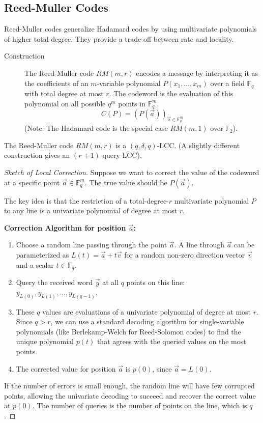 \subsection{Reed-Muller Codes}

Reed-Muller codes generalize Hadamard codes by using multivariate polynomials of higher total degree. They provide a trade-off between rate and locality.

\begin{description}
    \item[Construction] The Reed-Muller code $RM(m, r)$ encodes a message by interpreting it as the coefficients of an $m$-variable polynomial $P(x_1, \dots, x_m)$ over a field $\mathbb{F}_q$ with total degree at most $r$. The codeword is the evaluation of this polynomial on all possible $q^m$ points in $\mathbb{F}_q^m$.
    \[ C(P) = (P(\vec{a}))_{\vec{a} \in \mathbb{F}_q^m} \]
    (Note: The Hadamard code is the special case $RM(m, 1)$ over $\mathbb{F}_2$).
\end{description}

\begin{theorem}
The Reed-Muller code $RM(m, r)$ is a $(q, \delta, q)$-LCC. (A slightly different construction gives an $(r+1)$-query LCC).
\end{theorem}
\begin{proof}[Sketch of Local Correction]
Suppose we want to correct the value of the codeword at a specific point $\vec{a} \in \mathbb{F}_q^m$. The true value should be $P(\vec{a})$.

The key idea is that the restriction of a total-degree-$r$ multivariate polynomial $P$ to any line is a univariate polynomial of degree at most $r$.

\textbf{Correction Algorithm for position $\vec{a}$:}
\begin{enumerate}
    \item Choose a random line passing through the point $\vec{a}$. A line through $\vec{a}$ can be parameterized as $L(t) = \vec{a} + t\vec{v}$ for a random non-zero direction vector $\vec{v}$ and a scalar $t \in \mathbb{F}_q$.
    \item Query the received word $\vec{y}$ at all $q$ points on this line: $y_{L(0)}, y_{L(1)}, \dots, y_{L(q-1)}$.
    \item These $q$ values are evaluations of a univariate polynomial of degree at most $r$. Since $q > r$, we can use a standard decoding algorithm for single-variable polynomials (like Berlekamp-Welch for Reed-Solomon codes) to find the unique polynomial $p(t)$ that agrees with the queried values on the most points.
    \item The corrected value for position $\vec{a}$ is $p(0)$, since $\vec{a} = L(0)$.
\end{enumerate}
If the number of errors is small enough, the random line will have few corrupted points, allowing the univariate decoding to succeed and recover the correct value at $p(0)$. The number of queries is the number of points on the line, which is $q$.
\end{proof}

